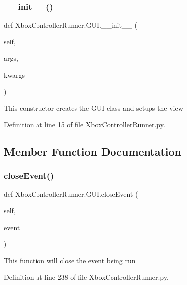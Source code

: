 \subsubsection{\texorpdfstring{\+\_\+\+\_\+init\+\_\+\+\_\+()}{\_\_init\_\_()}}
{\footnotesize\ttfamily def Xbox\+Controller\+Runner.\+G\+U\+I.\+\_\+\+\_\+init\+\_\+\+\_\+ (\begin{DoxyParamCaption}\item[{}]{self,  }\item[{}]{args,  }\item[{}]{kwargs }\end{DoxyParamCaption})}

\begin{DoxyVerb}This constructor creates the GUI class and setups the view\end{DoxyVerb}
 

Definition at line 15 of file Xbox\+Controller\+Runner.\+py.



\subsection{Member Function Documentation}
\mbox{\label{class_xbox_controller_runner_1_1_g_u_i_a2b096a0935c8dbaf037df7f6ada48b58}} 
\subsubsection{\texorpdfstring{close\+Event()}{closeEvent()}}
{\footnotesize\ttfamily def Xbox\+Controller\+Runner.\+G\+U\+I.\+close\+Event (\begin{DoxyParamCaption}\item[{}]{self,  }\item[{}]{event }\end{DoxyParamCaption})}

\begin{DoxyVerb}This function will close the event being run\end{DoxyVerb}
 

Definition at line 238 of file Xbox\+Controller\+Runner.\+py.

\mbox{\label{class_xbox_controller_runner_1_1_g_u_i_a26f351ae3bef246b600493ce76f18119}} 
